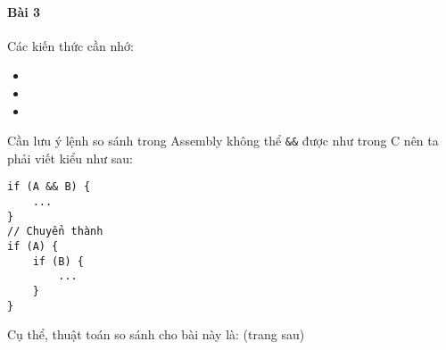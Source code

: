 \documentclass[main.tex]{subfiles}
\begin{document}
\inputminted[linenos,breaklines]{nasm}{answer_source/Bai2.asm}


\paragraph*{Bài 3}
Các kiến thức cần nhớ:
\begin{itemize}
    \item {}
    \item {}
    \item {}
\end{itemize}
Cần lưu ý lệnh so sánh trong Assembly không thể \verb#&&# được như  trong C nên ta phải viết kiểu như sau:
\begin{verbatim}
if (A && B) {
    ...
}
// Chuyển thành
if (A) {
    if (B) {
        ...
    }
}
\end{verbatim}
Cụ thể, thuật toán so sánh cho bài này là: (trang sau)
\end{document}
